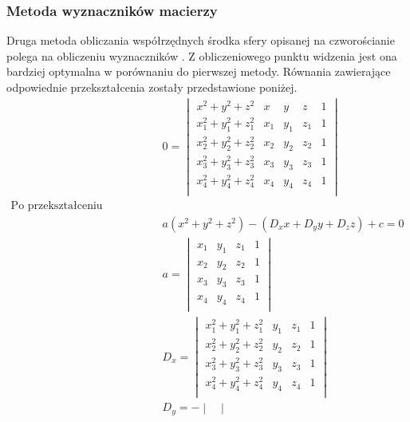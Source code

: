 \subsubsection{Metoda wyznaczników macierzy}
Druga metoda obliczania współrzędnych środka sfery opisanej na czworościanie polega na obliczeniu wyznaczników \cite{CircumTetraWolf}. Z obliczeniowego punktu widzenia jest ona bardziej optymalna w porównaniu do pierwszej metody. Równania zawierające odpowiednie przekształcenia zostały przedstawione poniżej.
\begin{equation}
    \begin{aligned}
            &0=\begin{vmatrix}
                x^2+y^2+z^2 & x&y&z&1 \\
                x_{1}^2+y_{1}^2+z_{1}^2 & x_{1}&y_{1}&z_{1}&1 \\
                x_{2}^2+y_{2}^2+z_{2}^2 & x_{2}&y_{2}&z_{2}&1 \\
                x_{3}^2+y_{3}^2+z_{3}^2 & x_{3}&y_{3}&z_{3}&1 \\
                x_{4}^2+y_{4}^2+z_{4}^2 & x_{4}&y_{4}&z_{4}&1 \\
            \end{vmatrix}\\
            \text{Po przekształceniu wyznacznika}\\
            &a(x^2+y^2+z^2)-(D_{x}x+D_{y}y+D_{z}z)+c=0\\
            &a=\begin{vmatrix}
               x_{1}&y_{1}&z_{1}&1 \\
                x_{2}&y_{2}&z_{2}&1 \\
                x_{3}&y_{3}&z_{3}&1 \\
                x_{4}&y_{4}&z_{4}&1 \\
            \end{vmatrix}\\
            &D_{x}=\begin{vmatrix}
                x_{1}^2+y_{1}^2+z_{1}^2 &y_{1}&z_{1}&1 \\
                x_{2}^2+y_{2}^2+z_{2}^2 & y_{2}&z_{2}&1 \\
                x_{3}^2+y_{3}^2+z_{3}^2 &y_{3}&z_{3}&1 \\
                x_{4}^2+y_{4}^2+z_{4}^2 &y_{4}&z_{4}&1 \\
            \end{vmatrix}\\
            &D_{y}=-\begin{vmatrix}

\end{vmatrix}
\end{aligned}
\end{equation}

